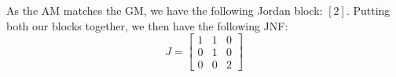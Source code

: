 \documentclass{article}
\begin{document}
As the AM matches the GM, we have the following Jordan block: $[2]$. Putting both our blocks together, we then have the following JNF:
$$J=\begin{bmatrix}
  1&1&0\\0&1&0\\0&0&2
\end{bmatrix}$$

\end{document}
